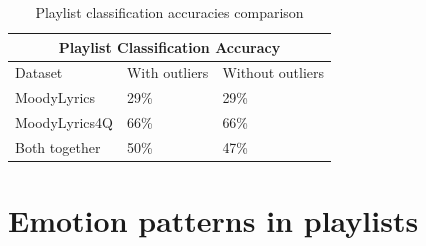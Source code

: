 \begin{table}[H]
\centering
\begin{tabular}{ |p{3cm}||p{1.5cm}|p{1.5cm}| }
 \hline
 \multicolumn{3}{|c|}{Playlist Classification Accuracy} \\
 \hline
Dataset & With outliers & Without outliers\\
 \hline
MoodyLyrics & 29\% & 29\%\\
MoodyLyrics4Q  & 66\%    &66\%\\
Both together &   50\%  & 47\%\\
\hline
\end{tabular}
\caption{Playlist classification accuracies comparison} \label{tab:comparison2}
\end{table}

\section{Emotion patterns in playlists}







 
